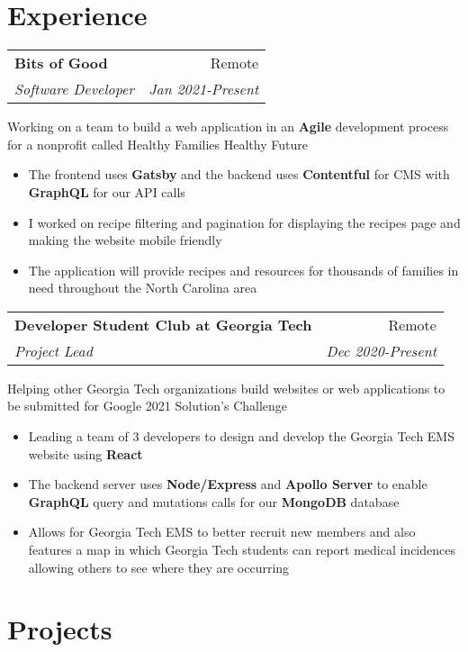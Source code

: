 \documentclass[letterpaper,8pt]{article}
\makeatletter
\newcommand{\resumeSubheading}[4]{
  \vspace{0.25em}
  \begin{tabular*}{1\textwidth}[t]{l@{\extracolsep{\fill}}r}
    \textbf{#1} & #2 \\
    \textit{#3} & \textit{#4} \\
  \end{tabular*}\vspace{-5pt}
}
\makeatother
\begin{document}
\section{Experience}

\resumeSubheading{Bits of Good}{Remote}{Software Developer}{Jan 2021-Present}

Working on a team to build a web application in an \textbf{Agile} development process for a nonprofit called Healthy Families Healthy Future

\begin{itemize}[label=\raisebox{0.25ex}{\tiny$\bullet$}]
    \item The frontend uses \textbf{Gatsby} and the backend uses \textbf{Contentful} for CMS with \textbf{GraphQL} for our API calls
    \item I worked on recipe filtering and pagination for displaying the recipes page and making the website mobile friendly
    \item The application will provide recipes and resources for thousands of families in need throughout the North Carolina area
\end{itemize}
\vspace{3pt}

\resumeSubheading{Developer Student Club at Georgia Tech}{Remote}{Project Lead}{Dec 2020-Present}

Helping other Georgia Tech organizations build websites or web applications to be submitted for Google 2021 Solution's Challenge

\begin{itemize}[label=\raisebox{0.25ex}{\tiny$\bullet$}]
    \item Leading a team of 3 developers to design and develop the Georgia Tech EMS website using \textbf{React}
    \item The backend server uses \textbf{Node/Express} and \textbf{Apollo Server} to enable \textbf{GraphQL} query and mutations calls for our \textbf{MongoDB} database
    \item Allows for Georgia Tech EMS to better recruit new members and also features a map in which Georgia Tech students can report medical incidences allowing others to see where they are occurring
\end{itemize}
\vspace{3pt}


\section{Projects}
\end{document}
